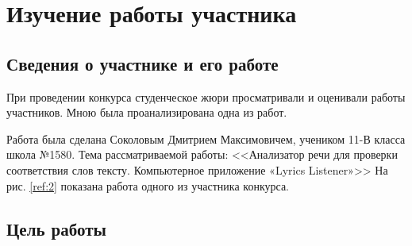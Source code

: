 \documentclass[12pt]{report}
\begin{document}
\chapter{Изучение работы участника}

\section{Сведения о участнике и его работе}

При проведении конкурса студенческое жюри просматривали и оценивали работы участников.
Мною была проанализирована одна из работ.

Работа была сделана Соколовым Дмитрием Максимовичем, учеником 11-В класса школа №1580.
Тема рассматриваемой работы: <<Анализатор речи для проверки соответствия слов тексту.
Компьютерное приложение «Lyrics Listener»>> На рис. \ref{ref:2} показана работа одного из участника конкурса.

\begin{figure}[ht!]	
\end{figure}
\section{Цель работы}
\end{document}
